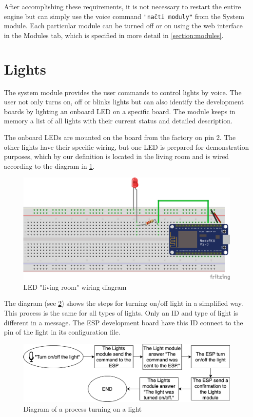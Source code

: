 After accomplishing these requirements, it is not necessary to restart the entire engine but can simply use the voice command \texttt{"načti moduly"} from the System module. Each particular module can be turned off or on using the web interface in the Modules tab, which is specified in more detail in \cref{section:modules}.



\section{Lights}

The system module provides the user commands to control lights by voice. The user not only turns on, off or blinks lights but can also identify the development boards by lighting an onboard LED on a specific board. The module keeps in memory a list of all lights with their current status and detailed description.

The onboard LEDs are mounted on the board from the factory on pin 2. The other lights have their specific wiring, but one LED is prepared for demonstration purposes, which by our definition is located in the living room and is wired according to the diagram in \cref{fig:led_schema}. 

\begin{figure}[H]
	\centering
	\includegraphics[width=\textwidth]{img/led_schema.png}
	\caption{LED "living room" wiring diagram}
	\label{fig:led_schema}
\end{figure}

The diagram (see \cref{fig:turn_light_diagram}) shows the steps for turning on/off light in a simplified way. This process is the same for all types of lights. Only an ID and type of light is different in a message. The ESP development board have this ID connect to the pin of the light in its configuration file.

\begin{figure}[H]
    \centering
    \includegraphics[width=\textwidth]{img/turn_light_diagram.png}
    \caption{Diagram of a process turning on a light}
    \label{fig:turn_light_diagram}
\end{figure}


